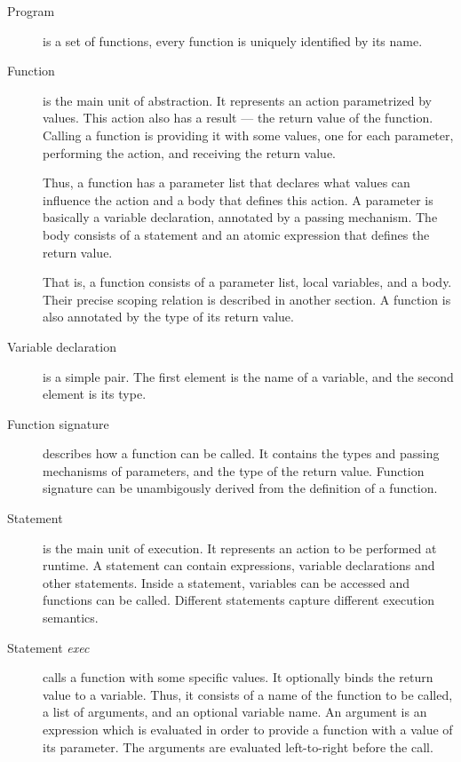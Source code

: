 \documentclass [a4paper] {article}
\begin{document}
\begin {description}

\item [Program] is a set of functions, every function is uniquely identified by
its name.

\item [Function] is the main unit of abstraction. It represents an action
parametrized by values. This action also has a result --- the return value of
the function. Calling a function is providing it with some values, one for each
parameter, performing the action, and receiving the return value.

Thus, a function has a parameter list that declares what values can influence
the action and a body that defines this action. A parameter is basically a
variable declaration, annotated by a passing mechanism. The body consists of a
statement and an atomic expression that defines the return value.

That is, a function consists of a parameter list, local variables, and a body.
Their precise scoping relation is described in another section. A function is
also annotated by the type of its return value.

\item [Variable declaration] is a simple pair. The first element is the name
of a variable, and the second element is its type.

\item [Function signature] describes how a function can be called. It contains
the types and passing mechanisms of parameters, and the type of the return
value. Function signature can be unambigously derived from the definition of a
function.

\item [Statement] is the main unit of execution. It represents an action to be
performed at runtime. A statement can contain expressions, variable declarations
and other statements. Inside a statement, variables can be accessed and
functions can be called. Different statements capture different execution
semantics.

\item [Statement \emph{exec}] calls a function with some specific values. It
optionally binds the return value to a variable. Thus, it consists of a name of
the function to be called, a list of arguments, and an optional variable name.
An argument is an expression which is evaluated in order to provide a function
with a value of its parameter. The arguments are evaluated left-to-right before
the call.


\end{description}
\end{document}

